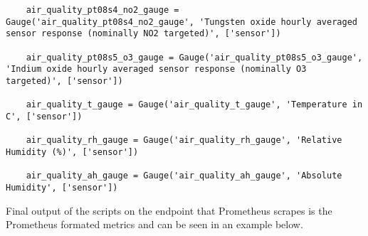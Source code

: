 \begin{verbatim}
    air_quality_pt08s4_no2_gauge = Gauge('air_quality_pt08s4_no2_gauge', 'Tungsten oxide hourly averaged sensor response (nominally NO2 targeted)', ['sensor'])

    air_quality_pt08s5_o3_gauge = Gauge('air_quality_pt08s5_o3_gauge', 'Indium oxide hourly averaged sensor response (nominally O3 targeted)', ['sensor'])

    air_quality_t_gauge = Gauge('air_quality_t_gauge', 'Temperature in C', ['sensor'])

    air_quality_rh_gauge = Gauge('air_quality_rh_gauge', 'Relative Humidity (%)', ['sensor'])

    air_quality_ah_gauge = Gauge('air_quality_ah_gauge', 'Absolute Humidity', ['sensor'])
\end{verbatim}

Final output of the scripts on the endpoint that Prometheus scrapes is the Prometheus formated metrics and can be seen in an example below.

